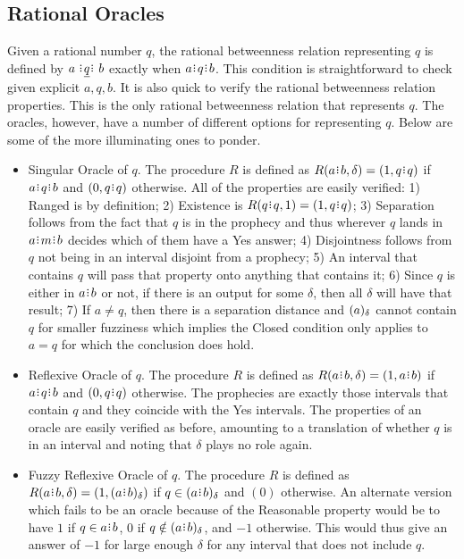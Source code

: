\documentclass[12pt]{article}
\begin{document}
\subsection{Rational Oracles}

Given a rational number $q$, the rational betweenness relation representing $q$ is defined by $a \xrel[q] b$ exactly when $a \rint q \rint b$. This condition is straightforward to check given explicit $a, q, b$. It is also quick to verify the rational betweenness relation properties. This is the only rational betweenness relation that represents $q$. The oracles, however, have a number of different options for representing $q$. Below are some of the more illuminating ones to ponder. 

\begin{itemize}
    \item Singular Oracle of $q$. The procedure $R$ is defined as $R(a \rint b,\delta) = (1, q \rint q)$ if $a \rint q \rint b$ and $(0, q \rint q)$ otherwise. All of the properties are easily verified: 1) Ranged is by definition; 2) Existence is $R(q\rint q, 1) = (1, q\rint q)$; 3) Separation follows from the fact that $q$ is in the prophecy and thus wherever $q$ lands in $a\rint m\rint b$ decides which of them have a Yes answer; 4) Disjointness follows from $q$ not being in an interval disjoint from a prophecy; 5) An interval that contains $q$ will pass that property onto anything that contains it; 6) Since $q$ is either in $a\rint b$ or not, if there is an output for some $\delta$, then all $\delta$ will have that result; 7) If $a \neq q$, then there is a separation distance and $(a)_{\delta}$ cannot contain $q$ for smaller fuzziness which implies the Closed condition only applies to $a=q$ for which the conclusion does hold. 
    
    \item Reflexive Oracle of $q$. The procedure $R$ is defined as $R(a\rint b, \delta) = (1, a\rint b)$ if $a\rint q \rint b$ and $(0, q \rint q)$ otherwise. The prophecies are exactly those intervals that contain $q$ and they coincide with the Yes intervals. The properties of an oracle are easily verified as before, amounting to a translation of whether $q$ is in  an interval and noting that $\delta$ plays no role again.

    \item Fuzzy Reflexive Oracle of $q$. The procedure $R$ is defined as $R(a\rint b, \delta) = (1, \halo{a\rint b})$ if $q \in \halo{a\rint  b}$ and $(0)$ otherwise. An alternate version which fails to be an oracle because of the Reasonable property would be to have $1$ if $q \in a \rint b$, $0$ if $q \notin \halo{a \rint b}$, and $-1$ otherwise. This would thus give an answer of $-1$ for large enough $\delta$ for any interval that does not include $q$. 
    

\end{itemize}
\end{document}
